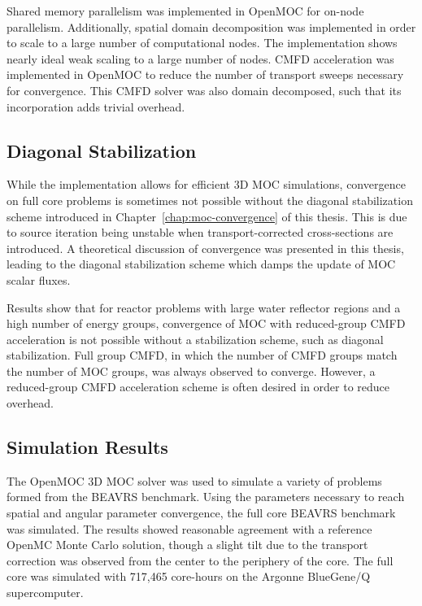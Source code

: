 Shared memory parallelism was implemented in OpenMOC for on-node parallelism. Additionally, spatial domain decomposition was implemented in order to scale to a large number of computational nodes. The implementation shows nearly ideal weak scaling to a large number of nodes. \ac{CMFD} acceleration was implemented in OpenMOC to reduce the number of transport sweeps necessary for convergence. This \ac{CMFD} solver was also domain decomposed, such that its incorporation adds trivial overhead.


\subsection{Diagonal Stabilization}
\label{sec:sub:diag-stab}

While the implementation allows for efficient 3D \ac{MOC} simulations, convergence on full core problems is sometimes not possible without the diagonal stabilization scheme introduced in Chapter~\ref{chap:moc-convergence} of this thesis. This is due to source iteration being unstable when transport-corrected cross-sections are introduced. A theoretical discussion of convergence was presented in this thesis, leading to the diagonal stabilization scheme which damps the update of \ac{MOC} scalar fluxes.

Results show that for reactor problems with large water reflector regions and a high number of energy groups, convergence of \ac{MOC} with reduced-group \ac{CMFD} acceleration is not possible without a stabilization scheme, such as diagonal stabilization. Full group \ac{CMFD}, in which the number of \ac{CMFD} groups match the number of \ac{MOC} groups, was always observed to converge. However, a reduced-group \ac{CMFD} acceleration scheme is often desired in order to reduce overhead.

\subsection{Simulation Results}
\label{sec:sub:sim-results}

The OpenMOC 3D \ac{MOC} solver was used to simulate a variety of problems formed from the BEAVRS benchmark. Using the parameters necessary to reach spatial and angular parameter convergence, the full core BEAVRS benchmark was simulated. The results showed reasonable agreement with a reference OpenMC Monte Carlo solution, though a slight tilt due to the transport correction was observed from the center to the periphery of the core. The full core was simulated with 717,465 core-hours on the Argonne BlueGene/Q supercomputer.

